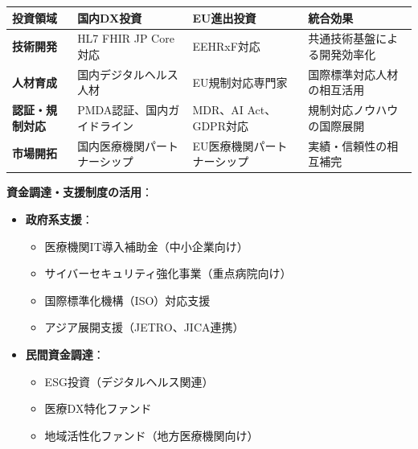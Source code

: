 \documentclass[
  a4paper,
  a4paper,
  11pt]{ltjsbook}
\providecommand{\tightlist}{%
  \setlength{\itemsep}{0pt}\setlength{\parskip}{0pt}}
\begin{document}
\begin{longtable}[]{@{}
  >{\raggedright\arraybackslash}p{}
  >{\raggedright\arraybackslash}p{}
  >{\raggedright\arraybackslash}p{}
  >{\raggedright\arraybackslash}p{}@{}}
\toprule\noalign{}
\begin{minipage}[b]{\linewidth}\raggedright
投資領域
\end{minipage} & \begin{minipage}[b]{\linewidth}\raggedright
国内DX投資
\end{minipage} & \begin{minipage}[b]{\linewidth}\raggedright
EU進出投資
\end{minipage} & \begin{minipage}[b]{\linewidth}\raggedright
統合効果
\end{minipage} \\
\midrule\noalign{}
\endhead
\bottomrule\noalign{}
\endlastfoot
\textbf{技術開発} & HL7 FHIR JP Core対応 & EEHRxF対応 &
共通技術基盤による開発効率化 \\
\textbf{人材育成} & 国内デジタルヘルス人材 & EU規制対応専門家 &
国際標準対応人材の相互活用 \\
\textbf{認証・規制対応} & PMDA認証、国内ガイドライン & MDR、AI
Act、GDPR対応 & 規制対応ノウハウの国際展開 \\
\textbf{市場開拓} & 国内医療機関パートナーシップ &
EU医療機関パートナーシップ & 実績・信頼性の相互補完 \\
\end{longtable}

\textbf{資金調達・支援制度の活用}：

\begin{itemize}
\tightlist
\item
  \textbf{政府系支援}：

  \begin{itemize}
  \tightlist
  \item
    医療機関IT導入補助金（中小企業向け）
  \item
    サイバーセキュリティ強化事業（重点病院向け）
  \item
    国際標準化機構（ISO）対応支援
  \item
    アジア展開支援（JETRO、JICA連携）
  \end{itemize}
\item
  \textbf{民間資金調達}：

  \begin{itemize}
  \tightlist
  \item
    ESG投資（デジタルヘルス関連）
  \item
    医療DX特化ファンド
  \item
    地域活性化ファンド（地方医療機関向け）
  \end{itemize}
\end{itemize}
\end{document}
